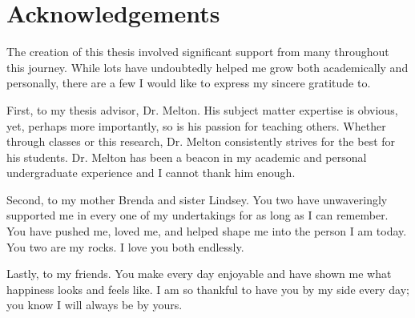 
\cleardoublepage
\thispagestyle{empty}

\chapter{Acknowledgements}
\noindent The creation of this thesis involved significant support from many
throughout this journey. While lots have undoubtedly helped me grow
both academically and personally, there are a few I would like to express my 
sincere gratitude to. \newline

\noindent First, to my thesis advisor, Dr. Melton. His subject matter expertise is obvious, yet, 
perhaps more importantly, so is his passion for teaching others. Whether through classes or this research,
Dr. Melton consistently strives for the best for his students. Dr. Melton has been a beacon in my academic 
and personal undergraduate experience and I cannot thank him enough. \newline

\noindent Second, to my mother Brenda and sister Lindsey. You two have unwaveringly supported me 
in every one of my undertakings for as long as I can remember. 
You have pushed me, loved me, and helped shape me into the person I am today.
You two are my rocks. I love you both endlessly.\newline

\noindent Lastly, to my friends. You make every day enjoyable and have shown me what happiness looks and
feels like. I am so thankful to have you by my side every day; you know I will always be by yours.
\cleardoublepage
